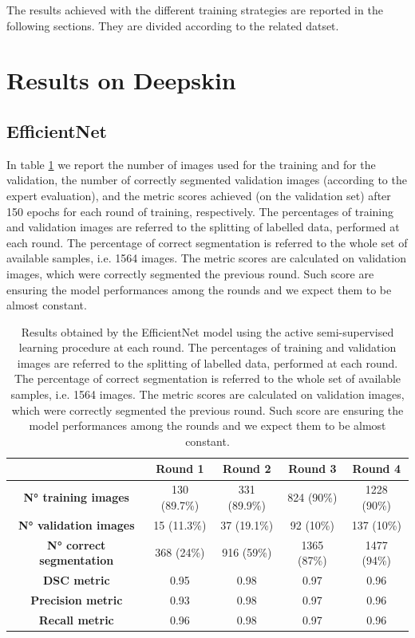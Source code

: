 \documentclass[../main.tex]{subfiles}
\begin{document}
The results achieved with the different training strategies are reported in the following sections.
They are divided according to the related datset.

\section{Results on Deepskin}
\subsection{EfficientNet}

In table \ref{tab:results-eff-deepskin} we report the number of images used for the training and for the validation, the number of correctly segmented validation images (according to the expert evaluation), and the metric scores achieved (on the validation set) after 150 epochs for each round of training, respectively. 
The percentages of training and validation images are referred to the splitting of labelled data, performed at each round. 
The percentage of correct segmentation is  referred to the whole set of available samples, i.e. 1564 images.
The metric scores are calculated on validation images, which were correctly segmented the previous round. 
Such score are ensuring the model performances among the rounds and we expect them to be almost constant.
\hspace{-1cm}
\begin{table}[H]
    \centering
    \begin{tabular}{c|c|c|c|c|}
 
        \textbf{} & \textbf{Round 1} & \textbf{Round 2} & \textbf{Round 3} & \textbf{Round 4 } \\ \hline
        \textbf{N° training images} & 130 (89.7\%) & 331 (89.9\%) & 824 (90\%) & 1228 (90\%)\\ \hline
        \textbf{N° validation images} & 15 (11.3\%) & 37 (19.1\%) & 92 (10\%) & 137 (10\%)  \\ \hline
        \textbf{N° correct segmentation} &  368 (24\%) & 916 (59\%) & 1365 (87\%) & 1477 (94\%)  \\ \hline
        \textbf{DSC metric} & 0.95 & 0.98 & 0.97 & 0.96  \\ \hline
        \textbf{Precision metric} & 0.93 & 0.98 & 0.97 & 0.96  \\ \hline
        \textbf{Recall metric} & 0.96 & 0.98 & 0.97 & 0.96  \\ \hline
    \end{tabular}
    \caption{Results obtained by the EfficientNet model using the active semi-supervised learning procedure at each round.
    The percentages of training and validation images are referred to the splitting of labelled data, performed at each round. 
The percentage of correct segmentation is  referred to the whole set of available samples, i.e. 1564 images.
The metric scores are calculated on validation images, which were correctly segmented the previous round. 
Such score are ensuring the model performances among the rounds and we expect them to be almost constant.} 
    \label{tab:results-eff-deepskin}
\end{table}
\end{document}
